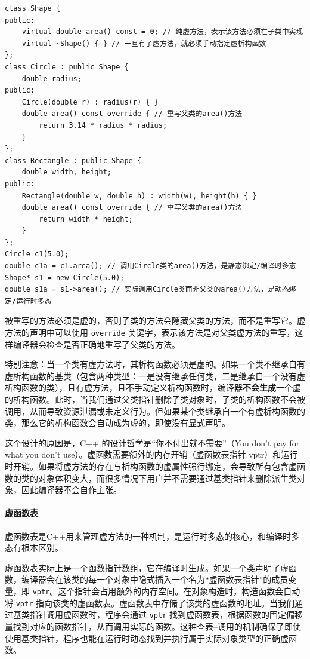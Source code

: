\begin{verbatim}
class Shape {
public:
    virtual double area() const = 0; // 纯虚方法，表示该方法必须在子类中实现
    virtual ~Shape() { } // 一旦有了虚方法，就必须手动指定虚析构函数
};
class Circle : public Shape {
    double radius;
public:
    Circle(double r) : radius(r) { }
    double area() const override { // 重写父类的area()方法
        return 3.14 * radius * radius;
    }
};
class Rectangle : public Shape {
    double width, height;
public:
    Rectangle(double w, double h) : width(w), height(h) { }
    double area() const override { // 重写父类的area()方法
        return width * height;
    }
};
Circle c1(5.0);
double c1a = c1.area(); // 调用Circle类的area()方法，是静态绑定/编译时多态
Shape* s1 = new Circle(5.0);
double s1a = s1->area(); // 实际调用Circle类而非父类的area()方法，是动态绑定/运行时多态
\end{verbatim}

被重写的方法必须是虚的，否则子类的方法会隐藏父类的方法，而不是重写它。虚方法的声明中可以使用 \verb|override| 关键字，表示该方法是对父类虚方法的重写，这样编译器会检查是否正确地重写了父类的方法。

特别注意：当一个类有虚方法时，其析构函数必须是虚的。如果一个类不继承自有虚析构函数的基类（包含两种类型：一是没有继承任何类，二是继承自一个没有虚析构函数的类），且有虚方法，且不手动定义析构函数时，编译器\textbf{不会生成}一个虚的析构函数。此时，当我们通过父类指针删除子类对象时，子类的析构函数不会被调用，从而导致资源泄漏或未定义行为。但如果某个类继承自一个有虚析构函数的类，那么它的析构函数会自动成为虚的，即使没有显式声明。

这个设计的原因是，C++ 的设计哲学是“你不付出就不需要”（You don't pay for what you don't use）。虚函数需要额外的内存开销（虚函数表指针 vptr）和运行时开销。如果将虚方法的存在与析构函数的虚属性强行绑定，会导致所有包含虚函数的类的对象体积变大，而很多情况下用户并不需要通过基类指针来删除派生类对象，因此编译器不会自作主张。

\paragraph{虚函数表}

虚函数表是C++用来管理虚方法的一种机制，是运行时多态的核心，和编译时多态有根本区别。

虚函数表实际上是一个函数指针数组，它在编译时生成。如果一个类声明了虚函数，编译器会在该类的每一个对象中隐式插入一个名为“虚函数表指针”的成员变量，即 \verb|vptr|。这个指针会占用额外的内存空间。在对象构造时，构造函数会自动将 \verb|vptr| 指向该类的虚函数表。虚函数表中存储了该类的虚函数的地址。当我们通过基类指针调用虚函数时，程序会通过 \verb|vptr| 找到虚函数表，根据函数的固定偏移量找到对应的函数指针，从而调用实际的函数。这种查表--调用的机制确保了即使使用基类指针，程序也能在运行时动态找到并执行属于实际对象类型的正确虚函数。

